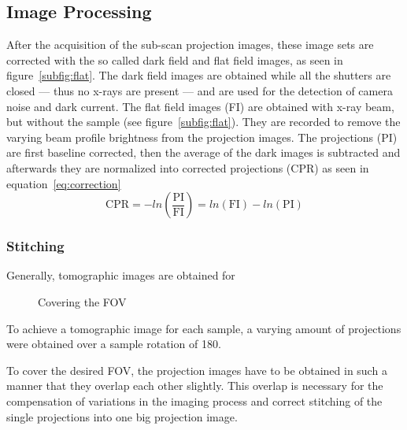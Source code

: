 \subsection{Image Processing}
\label{subsec:image processing}
After the acquisition of the sub-scan projection images, these image sets are corrected with the so called dark field and flat field images, as seen in figure~\ref{subfig:flat}. The dark field images are obtained while all the shutters are closed --- thus no x-rays are present --- and are used for the detection of camera noise and dark current. The flat field images (FI) are obtained with x-ray beam, but without the sample (see figure~\ref{subfig:flat}). They are recorded to remove the varying beam profile brightness from the projection images. The projections (PI) are first baseline corrected, then the average of the dark images is subtracted and afterwards they are normalized into corrected projections (CPR) as seen in equation~\ref{eq:correction}
\begin{equation}
\text{CPR}=-ln\left(\frac{\text{PI}}{\text{FI}}\right)=ln(\text{FI})-ln(\text{PI})
\label{eq:correction}
\end{equation}

\subsubsection{Stitching}
Generally, tomographic images are obtained for 

\begin{figure}[tb]
	\centering
	\caption{Covering the FOV}
	\label{fig:covering}
\end{figure}


To achieve a tomographic image for each sample, a varying amount of projections were obtained over a sample rotation of \unit{180}{\degree}.




To cover the desired FOV, the projection images have to be obtained in such a manner that they overlap each other slightly. This overlap is necessary for the compensation of variations in the imaging process and correct stitching of the single projections into one big projection image. 

